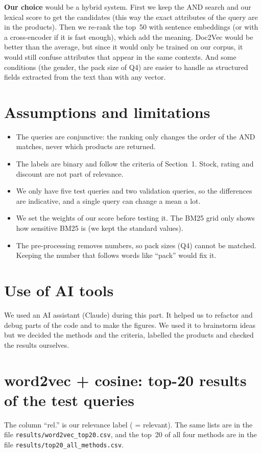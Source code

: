 \documentclass[11pt,a4paper]{article}
\begin{document}
\textbf{Our choice} would be a hybrid system. First we keep the AND search and our lexical score to get the candidates
(this way the exact attributes of the query are in the products). Then we re-rank the top~50 with sentence embeddings
(or with a cross-encoder if it is fast enough), which add the meaning. Doc2Vec would be better than the average, but
since it would only be trained on our corpus, it would still confuse attributes that appear in the same contexts. And
some conditions (the gender, the pack size of Q4) are easier to handle as structured fields extracted from the text
than with any vector.

\section{Assumptions and limitations}
\begin{itemize}
\item The queries are conjunctive: the ranking only changes the order of the AND matches, never which products are
returned.
\item The labels are binary and follow the criteria of Section~1. Stock, rating and discount are not part of relevance.
\item We only have five test queries and two validation queries, so the differences are indicative, and a single query
can change a mean a lot.
\item We set the weights of our score before testing it. The BM25 grid only shows how sensitive BM25 is (we kept the
standard values).
\item The pre-processing removes numbers, so pack sizes (Q4) cannot be matched. Keeping the number that follows words like
``pack'' would fix it.
\end{itemize}

\section*{Use of AI tools}
We used an AI assistant (Claude) during this part. It helped us to refactor and debug parts of the code and to make the
figures. We used it to brainstorm ideas but we decided the methods and the criteria, labelled the products and
checked the results ourselves.

\newpage
\appendix
\section{word2vec + cosine: top-20 results of the test queries}
\label{app:w2v}
The column ``rel.'' is our relevance label (\checkmark{} = relevant). The same lists are in the file
\texttt{results/word2vec\_top20.csv}, and the top~20 of all four methods are in the file
\texttt{results/top20\_all\_methods.csv}.
\end{document}
